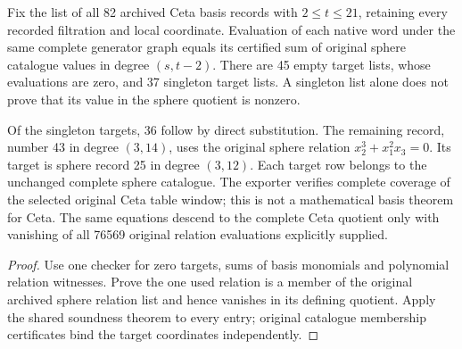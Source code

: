 \begin{lemma}
  \label{lem:lin-naturality-batch21-words}
  \leanok
  Fix the list of all 82 archived Ceta basis records with $2\le t\le21$,
  retaining every recorded filtration and local coordinate. Evaluation of
  each native word under the same complete generator graph equals its
  certified sum of original sphere catalogue values in degree $(s,t-2)$.
  There are 45 empty target lists, whose evaluations are zero, and 37
  singleton target lists. A singleton list alone does not prove that its
  value in the sphere quotient is nonzero.

  Of the singleton targets, 36 follow by direct substitution. The remaining
  record, number 43 in degree $(3,14)$, uses the original sphere relation
  $x_2^3+x_1^2x_3=0$. Its target is sphere record 25 in degree $(3,12)$.
  Each target row belongs to the unchanged complete sphere catalogue.
  The exporter verifies complete coverage of the selected original Ceta
  table window; this is not a mathematical basis theorem for Ceta.
  The same equations descend to the complete Ceta quotient only with
  vanishing of all 76569 original relation evaluations explicitly supplied.
\end{lemma}
\begin{proof}
  \leanok
  Use one checker for zero targets, sums of basis monomials and polynomial
  relation witnesses. Prove the one used relation is a member of the original
  archived sphere relation list and hence vanishes in its defining quotient.
  Apply the shared soundness theorem to every entry; original catalogue
  membership certificates bind the target coordinates independently.
\end{proof}

